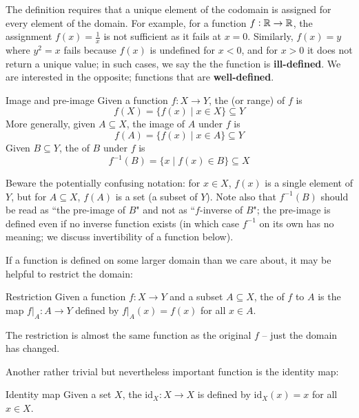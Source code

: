 \begin{remark}
The definition requires that a unique element of the codomain is assigned for every element of the domain. For example, for a function $f:\mathbb R \to \mathbb R$, the assignment $f(x)=\frac{1}{x}$ is not sufficient as it fails at $x=0$. Similarly, $f(x)=y$ where $y^2=x$ fails because $f(x)$ is undefined for $x<0$, and for $x>0$ it does not return a unique value; in such cases, we say the the function is \textbf{ill-defined}. We are interested in the opposite; functions that are \textbf{well-defined}.
\end{remark}

\begin{defn}{Image and pre-image}{}
Given a function $f:X \to Y$, the  (or range) of $f$ is
\[ f(X) = \{f(x) \mid x \in X\} \subseteq Y \]
More generally, given $A \subseteq X$, the image of $A$ under $f$ is
\[ f(A) = \{f(x) \mid x \in A\} \subseteq Y \]
Given $B \subseteq Y$, the  of $B$ under $f$ is
\[ f^{-1}(B) = \{x \mid f(x) \in B\} \subseteq X \]
\end{defn}

\begin{remark}
Beware the potentially confusing notation: for $x \in X$, $f(x)$ is a single element of $Y$, but for $A \subseteq X$, $f(A)$ is a set (a subset of $Y$). Note also that $f^{-1}(B)$ should be read as ``the pre-image of $B$" and not as ``$f$-inverse of $B$"; the pre-image is defined even if no inverse function exists (in which case $f^{-1}$ on its own has no meaning; we discuss invertibility of a function below).
\end{remark}

If a function is defined on some larger domain than we care about, it may be helpful to restrict the domain:

\begin{defn}{Restriction}{}
Given a function $f:X \to Y$ and a subset $A \subseteq X$, the  of $f$ to $A$ is the map $f|_A:A \to Y$ defined by $f|_A(x) = f(x)$ for all $x \in A$.
\end{defn}

The restriction is almost the same function as the original $f$ -- just the domain has changed.

Another rather trivial but nevertheless important function is the identity map:

\begin{defn}{Identity map}{}
Given a set $X$, the  $\mathrm{id}_X:X \to X$ is defined by $\mathrm{id}_X(x) = x$ for all $x \in X$.
\end{defn}

